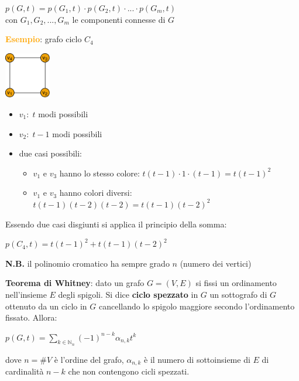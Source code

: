 \begin{flushleft}
\begin{itemize}[nosep]
        {\centering
            $p(G, t) = p(G_1, t) \cdot p(G_2, t) \cdot ... \cdot p(G_m, t)$ \\
            con $G_1, G_2, ..., G_m$ le componenti connesse di $G$
        \par}
    \end{itemize}
    \begin{boxA}
        \textcolor{orange}{\textbf{Esempio}}: grafo ciclo $C_4$
        
        {\centering
            \includegraphics[width=0.15\textwidth]{img/c4}
        \par}
        \begin{itemize}[nosep]
            \item $v_1: \; t$ modi possibili
            \item $v_2: \; t-1$ modi possibili
            \item due casi possibili:
            \begin{itemize}[nosep]
                \item $v_1$ e $v_3$ hanno lo stesso colore: $t(t-1) \cdot 1 \cdot (t-1) = t(t-1)^2$
                \item $v_1$ e $v_3$ hanno colori diversi: $t(t-1)(t-2)(t-2) = t(t-1)(t-2)^2$
            \end{itemize}
        \end{itemize}
        Essendo due casi disgiunti si applica il principio della somma:

        {\centering
            $p(C_4, t) = t(t-1)^2 + t(t-1)(t-2)^2$
        \par}
        \textbf{N.B.} il polinomio cromatico ha sempre grado $n$ (numero dei vertici)
    \end{boxA}

    \textbf{Teorema di Whitney}: dato un grafo $G = (V, E)$ si fissi un ordinamento nell'insieme $E$ degli spigoli. Si dice \textbf{ciclo spezzato} in $G$ un sottografo di $G$ ottenuto da un ciclo in $G$ cancellando lo spigolo maggiore secondo l'ordinamento fissato. Allora:

    {\centering
        $p(G, t) = \underset{k \in \mathbb{N}_n}{\sum}(-1)^{n-k} \alpha_{n,k}t^k$
    \par}
    dove $n = \# V$ è l'ordine del grafo, $\alpha_{n,k}$ è il numero di sottoinsieme di $E$ di cardinalità $n-k$ che non contengono cicli spezzati.
    

\end{flushleft}
